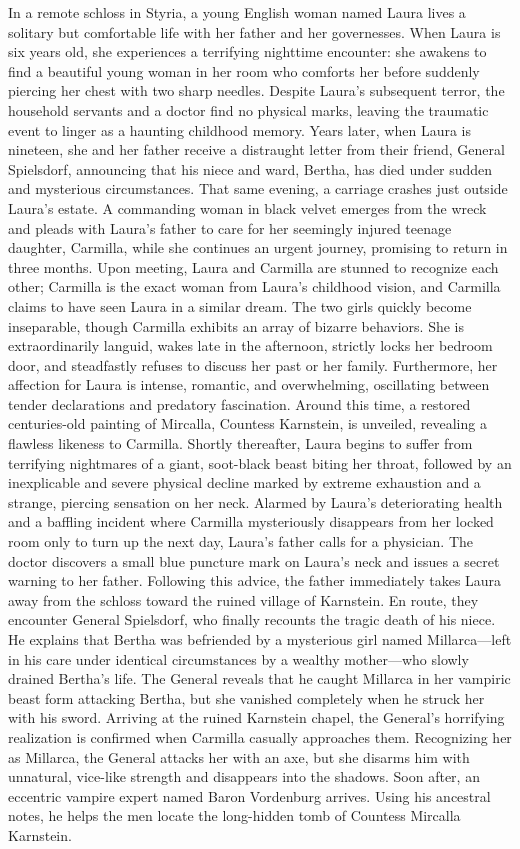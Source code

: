 \documentclass{article} %
\begin{document}
In a remote schloss in Styria, a young English woman named Laura lives a solitary but comfortable life with her father and her governesses. When Laura is six years old, she experiences a terrifying nighttime encounter: she awakens to find a beautiful young woman in her room who comforts her before suddenly piercing her chest with two sharp needles. Despite Laura's subsequent terror, the household servants and a doctor find no physical marks, leaving the traumatic event to linger as a haunting childhood memory. Years later, when Laura is nineteen, she and her father receive a distraught letter from their friend, General Spielsdorf, announcing that his niece and ward, Bertha, has died under sudden and mysterious circumstances. That same evening, a carriage crashes just outside Laura’s estate. A commanding woman in black velvet emerges from the wreck and pleads with Laura’s father to care for her seemingly injured teenage daughter, Carmilla, while she continues an urgent journey, promising to return in three months. Upon meeting, Laura and Carmilla are stunned to recognize each other; Carmilla is the exact woman from Laura’s childhood vision, and Carmilla claims to have seen Laura in a similar dream. The two girls quickly become inseparable, though Carmilla exhibits an array of bizarre behaviors. She is extraordinarily languid, wakes late in the afternoon, strictly locks her bedroom door, and steadfastly refuses to discuss her past or her family. Furthermore, her affection for Laura is intense, romantic, and overwhelming, oscillating between tender declarations and predatory fascination. Around this time, a restored centuries-old painting of Mircalla, Countess Karnstein, is unveiled, revealing a flawless likeness to Carmilla. Shortly thereafter, Laura begins to suffer from terrifying nightmares of a giant, soot-black beast biting her throat, followed by an inexplicable and severe physical decline marked by extreme exhaustion and a strange, piercing sensation on her neck. Alarmed by Laura's deteriorating health and a baffling incident where Carmilla mysteriously disappears from her locked room only to turn up the next day, Laura's father calls for a physician. The doctor discovers a small blue puncture mark on Laura's neck and issues a secret warning to her father. Following this advice, the father immediately takes Laura away from the schloss toward the ruined village of Karnstein. En route, they encounter General Spielsdorf, who finally recounts the tragic death of his niece. \textcolor{skipred}{He explains that Bertha was befriended by a mysterious girl named Millarca—left in his care under identical circumstances by a wealthy mother—who slowly drained Bertha's life.} The General reveals that he caught Millarca in her vampiric beast form attacking Bertha, but she vanished completely when he struck her with his sword. Arriving at the ruined Karnstein chapel, the General's horrifying realization is confirmed when Carmilla casually approaches them. Recognizing her as Millarca, the General attacks her with an axe, but she disarms him with unnatural, vice-like strength and disappears into the shadows. Soon after, an eccentric vampire expert named Baron Vordenburg arrives. Using his ancestral notes, he helps the men locate the long-hidden tomb of Countess Mircalla Karnstein. 
\end{document}

